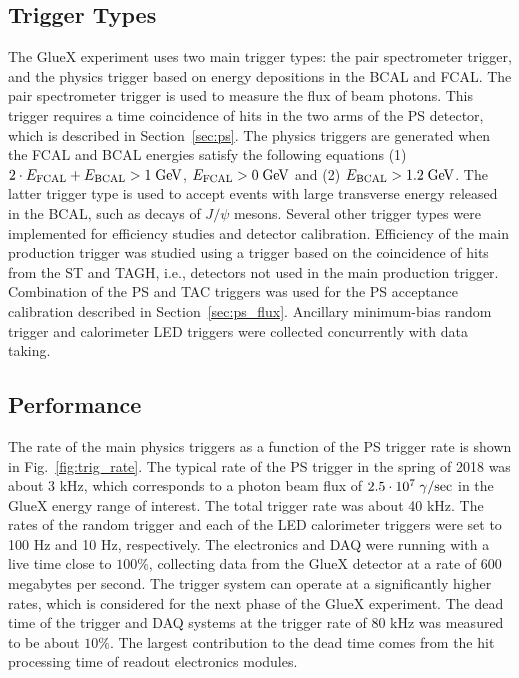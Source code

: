 \subsection{Trigger Types \label{sec:triggers}}

The GlueX experiment uses two main trigger types: the pair spectrometer trigger, and the physics trigger based on energy depositions in the BCAL and FCAL. The 
pair spectrometer trigger is used to measure the flux of beam photons. This trigger requires a time coincidence of hits in the 
two arms of the PS detector, which is described in Section~\ref{sec:ps}. The physics triggers are generated when the FCAL and BCAL energies  satisfy the following equations (1) $2\cdot E_{\rm FCAL} + E_{\rm BCAL} > 1\;{\rm GeV}$,  $E_{\rm FCAL} > 0\; {\rm GeV}$ and (2) $E_{\rm BCAL} > 1.2\;{\rm GeV}$. The latter trigger type is used to accept events with large transverse energy released in the BCAL, such as decays of $J/\psi$ mesons. Several other trigger types were implemented for efficiency studies and detector calibration. 
Efficiency of the main production trigger was studied using a trigger based on the coincidence of hits from the ST and TAGH, i.e., detectors not used in the main production trigger. Combination of the PS and TAC triggers was used for the PS acceptance calibration described in Section~\ref{sec:ps_flux}. Ancillary minimum-bias random trigger and calorimeter LED triggers were collected concurrently with data taking.

\subsection{Performance \label{sec:trigperformance}}
The rate of the main physics triggers as a function of the PS trigger rate is shown in Fig.~\ref{fig:trig_rate}.
The typical rate of the PS trigger in the spring of 2018 was about 3 kHz, which corresponds to a photon beam flux of $2.5\cdot 10^7\; \gamma/{\rm sec}$ in the GlueX energy range of interest. The total trigger rate was about 40 kHz. The rates of the random trigger and each of the LED calorimeter triggers were set to 100 Hz and 10 Hz, respectively. The electronics and DAQ were running with a live time close to 
$100 \%$, collecting data from the GlueX detector at a rate of 600 megabytes per second.
The trigger system can operate at a significantly higher rates, which is considered for the next phase
of the GlueX experiment. The dead time of the trigger and DAQ systems at the trigger rate of 80 kHz
was measured to be about $10 \%$. The largest contribution to the dead time comes from the hit processing
time of readout electronics modules. 


